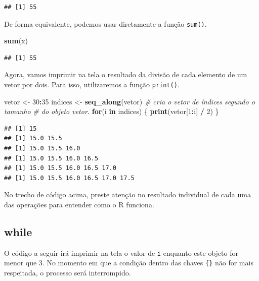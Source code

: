 \documentclass[
]{book}
\newenvironment{Shaded}{\begin{snugshade}}{\end{snugshade}}
\newcommand{\CommentTok}[1]{\textcolor[rgb]{0.56,0.35,0.01}{\textit{#1}}}
\newcommand{\ControlFlowTok}[1]{\textcolor[rgb]{0.13,0.29,0.53}{\textbf{#1}}}
\newcommand{\DecValTok}[1]{\textcolor[rgb]{0.00,0.00,0.81}{#1}}
\newcommand{\KeywordTok}[1]{\textcolor[rgb]{0.13,0.29,0.53}{\textbf{#1}}}
\newcommand{\NormalTok}[1]{#1}
\newcommand{\OperatorTok}[1]{\textcolor[rgb]{0.81,0.36,0.00}{\textbf{#1}}}
\newcommand{\StringTok}[1]{\textcolor[rgb]{0.31,0.60,0.02}{#1}}
\begin{document}
\begin{verbatim}
## [1] 55
\end{verbatim}

De forma equivalente, podemos usar diretamente a função \texttt{sum()}.

\begin{Shaded}
\begin{Highlighting}[]
\KeywordTok{sum}\NormalTok{(x)}
\end{Highlighting}
\end{Shaded}

\begin{verbatim}
## [1] 55
\end{verbatim}

Agora, vamos imprimir na tela o resultado da divisão de cada elemento de um vetor por dois. Para isso, utilizaremos a função \texttt{print()}.

\begin{Shaded}
\begin{Highlighting}[]
\NormalTok{vetor <{-}}\StringTok{ }\DecValTok{30}\OperatorTok{:}\DecValTok{35}
\NormalTok{indices <{-}}\StringTok{ }\KeywordTok{seq\_along}\NormalTok{(vetor) }\CommentTok{\# cria o vetor de índices segundo o tamanho }
                            \CommentTok{\# do objeto vetor.   }
\ControlFlowTok{for}\NormalTok{(i }\ControlFlowTok{in}\NormalTok{ indices) \{}
  \KeywordTok{print}\NormalTok{(vetor[}\DecValTok{1}\OperatorTok{:}\NormalTok{i] }\OperatorTok{/}\StringTok{ }\DecValTok{2}\NormalTok{)}
\NormalTok{\}}
\end{Highlighting}
\end{Shaded}

\begin{verbatim}
## [1] 15
## [1] 15.0 15.5
## [1] 15.0 15.5 16.0
## [1] 15.0 15.5 16.0 16.5
## [1] 15.0 15.5 16.0 16.5 17.0
## [1] 15.0 15.5 16.0 16.5 17.0 17.5
\end{verbatim}

No trecho de código acima, preste atenção no resultado individual de cada uma das operações para entender como o R funciona.

\hypertarget{while}{%
\subsection{while}\label{while}}

O código a seguir irá imprimir na tela o valor de \texttt{i} enquanto este objeto for menor que 3. No momento em que a condição dentro das chaves \texttt{\{\}} não for mais respeitada, o processo será interrompido.
\end{document}
